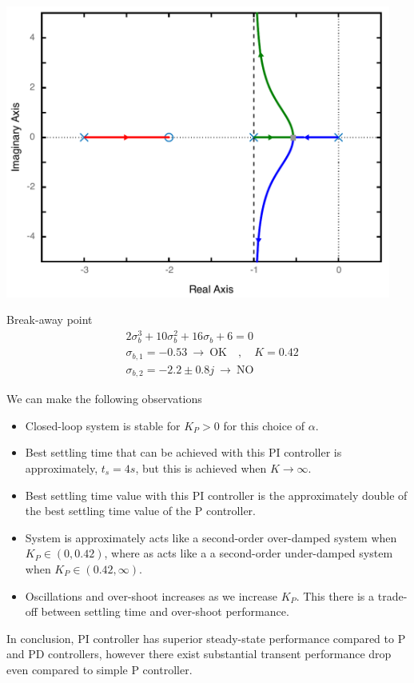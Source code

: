 \documentclass[twoside]{article}
\begin{document}
\begin{minipage}[h]{0.5\linewidth}
    \begin{center}
      \includegraphics[width=0.95\textwidth]{PIlocus}
    \end{center}
\end{minipage}
\begin{minipage}[h]{0.5\linewidth}
	Break-away point
	\begin{align*}
	& 2 \sigma_{b}^3 + 10 \sigma_{b}^2 + 16 \sigma_b + 6 = 0 
	\\
	& \sigma_{b,1} = - 0.53  \ \rightarrow \ \mathrm{OK} \quad ,
          \quad K = 0.42
	\\
	& \sigma_{b,2} =  -2.2 \pm 0.8 j \ \rightarrow \ \mathrm{NO}
	\end{align*}
\end{minipage}

We can make the following observations
%
\begin{itemize}
 \item Closed-loop system is stable for $K_P > 0$ for this choice of
   $\alpha$. 
  \item Best settling time that can be achieved with this PI controller
    is approximately, $t_{s} = 4 s$, but this is achieved when $K \to
    \infty$.
  \item Best settling time value with this PI controller is the
    approximately double of the best settling time value of the
    P controller.
  \item System is approximately acts like a second-order over-damped
   system when $K_P \in (0,0.42)$, where as acts like a a second-order 
   under-damped system when $K_P \in (0.42,\infty)$. 
   \item Oscillations and over-shoot increases as we increase $K_P$. 
   This there is a trade-off between settling time and over-shoot
   performance. 
\end{itemize}
% 
In conclusion, PI controller has superior steady-state performance
compared to P and PD controllers, however there exist substantial 
transent performance drop even compared to simple P controller. 
\end{document}
